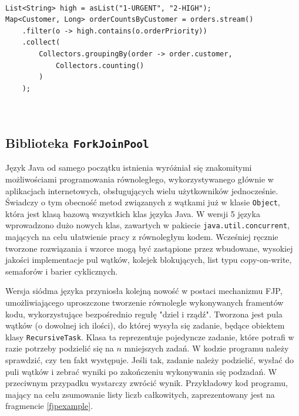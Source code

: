\documentclass[12pt]{extarticle}
\begin{document}
\begin{lstlisting}[label=advanced, caption=Zaawansowane wykorzystanie Stream API]

List<String> high = asList("1-URGENT", "2-HIGH");
Map<Customer, Long> orderCountsByCustomer = orders.stream()
    .filter(o -> high.contains(o.orderPriority))
    .collect(
        Collectors.groupingBy(order -> order.customer,
            Collectors.counting()
        )
    );
    
    

\end{lstlisting}

\subsection{Biblioteka \texttt{ForkJoinPool}}

    Język Java od samego początku istnienia wyróżniał się znakomitymi możliwościami programowania równoległego, wykorzystywanego głównie w aplikacjach internetowych, obsługujących wielu użytkowników jednocześnie. Świadczy o tym obecność metod związanych z wątkami już w klasie \texttt{Object}, która jest klasą bazową wszystkich klas języka Java. W wersji 5 języka wprowadzono dużo nowych klas, zawartych w pakiecie \texttt{java.util.concurrent}, mających na celu ułatwienie pracy z równoległym kodem. Wcześniej ręcznie tworzone rozwiązania i wzorce mogą być zastąpione przez wbudowane, wysokiej jakości implementacje pul wątków, kolejek blokujących, list typu copy-on-write, semaforów i barier cyklicznych.
    
    Wersja siódma języka przyniosła kolejną nowość w postaci mechanizmu FJP, umożliwiającego uproszczone tworzenie równolegle wykonywanych framentów kodu, wykorzystujące bezpośrednio regułę "dziel i rządź". Tworzona jest pula wątków (o dowolnej ich ilości), do której wysyła się zadanie, będące obiektem klasy \texttt{RecursiveTask}. Klasa ta reprezentuje pojedyncze zadanie, które potrafi w razie potrzeby podzielić się na $ n $ mniejszych zadań. W kodzie programu należy sprawdzić, czy ten fakt występuje. Jeśli tak, zadanie należy podzielić, wysłać do puli wątków i zebrać wyniki po zakończeniu wykonywania się podzadań. W przeciwnym przypadku wystarczy zwrócić wynik. Przykładowy kod programu, mający na celu zsumowanie listy liczb całkowitych, zaprezentowany jest na fragmencie \ref{fjpexample}.
\end{document}
